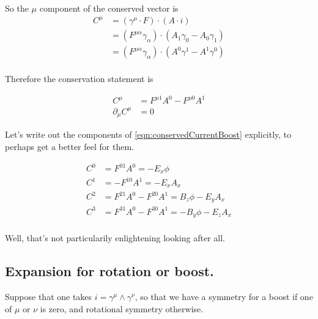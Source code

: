 \documentclass{article}
\begin{document}
So the $\mu$ component of the conserved vector is
\begin{align*}
C^\mu 
&= (\gamma^\mu \cdot F) \cdot (A \cdot i) \\
&= (F^{\mu\alpha} \gamma_\alpha) \cdot (A_1 \gamma_0 - A_0 \gamma_1) \\
&= (F^{\mu\alpha} \gamma_\alpha) \cdot (A^0 \gamma^1 - A^1 \gamma^0) \\
\end{align*}

Therefore the conservation statement is
%

\begin{align}\label{eqn:conservedCurrentBoost}
C^\mu &= F^{\mu 1} A^0 - F^{\mu 0} A^1 \\
\partial_\mu C^\mu &= 0
\end{align}

Let's write out the components of \ref{eqn:conservedCurrentBoost} explicitly, to perhaps get a better feel for them.

\begin{align*}
C^0 &= F^{0 1} A^0 = -E_x \phi \\
C^1 &= - F^{1 0} A^1 = -E_x A_x \\
C^2 &= F^{2 1} A^0 - F^{2 0} A^1 = B_z \phi - E_y A_x \\
C^3 &= F^{3 1} A^0 - F^{3 0} A^1 = -B_y \phi - E_z A_x \\
\end{align*}

Well, that's not particularily enlightening looking after all.

\subsection{ Expansion for rotation or boost. }

Suppose that one takes $i = \gamma^{\mu} \wedge \gamma^{\nu}$, so that we have a symmetry for a boost if one of $\mu$ or $\nu$ is zero,
and rotational symmetry otherwise.
\end{document}
